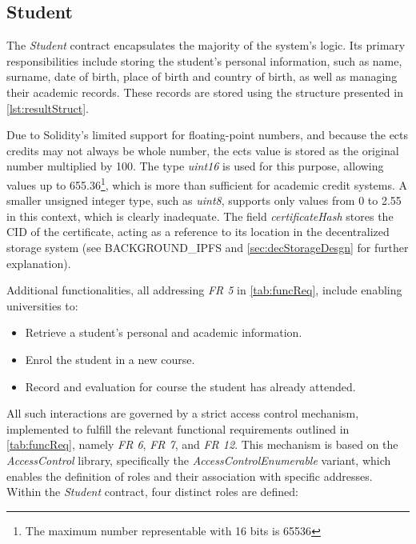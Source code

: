 \subsection{Student}
\label{ssec:studentContract}
The \textit{Student} contract encapsulates the majority of the system's logic. Its primary responsibilities include storing the student's personal information, such as name, surname, date of birth, place of birth and country of birth, as well as managing their academic records. These records are stored using the structure presented in \cref{lst:resultStruct}. 

Due to Solidity's limited support for floating-point numbers, and because the \acrshort{ects} credits may not always be whole number, the \acrshort{ects} value is stored as the original number multiplied by 100. The type \textit{uint16} is used for this purpose, allowing values up to 655.36\footnote{The maximum number representable with 16 bits is 65536},  which is more than sufficient for academic credit systems. A smaller unsigned integer type, such as \textit{uint8}, supports only values from 0 to 2.55 in this context, which is clearly inadequate. The field \textit{certificateHash} stores the CID of the certificate, acting as a reference to its location in the decentralized storage system (see BACKGROUND\_IPFS and \cref{sec:decStorageDesgn} for further explanation). 

Additional functionalities, all addressing \textit{FR 5} in \cref{tab:funcReq}, include enabling universities to:
\begin{itemize}
    \item Retrieve a student's personal and academic information.
    \item Enrol the student in a new course.
    \item Record and evaluation for course the student has already attended.
\end{itemize}
All such interactions are governed by a strict access control mechanism, implemented to fulfill the relevant functional requirements outlined in \cref{tab:funcReq}, namely \textit{FR 6}, \textit{FR 7}, and \textit{FR 12}. This mechanism is based on the \textit{AccessControl} library, specifically the \textit{AccessControlEnumerable} variant, which enables the definition of roles and their association with specific addresses. Within the \textit{Student} contract, four distinct roles are defined:

